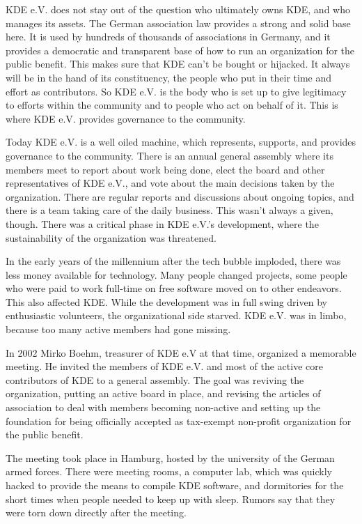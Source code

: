 KDE e.V. does not stay out of the question who ultimately owns KDE, and who manages its assets. The German association law provides a strong and solid base here. It is used by hundreds of thousands of associations in Germany, and it provides a democratic and transparent base of how to run an organization for the public benefit. This makes sure that KDE can't be bought or hijacked. It always will be in the hand of its constituency, the people who put in their time and effort as contributors. So KDE e.V. is the body who is set up to give legitimacy to efforts within the community and to people who act on behalf of it. This is where KDE e.V. provides governance to the community.

Today KDE e.V. is a well oiled machine, which represents, supports, and provides governance to the community. There is an annual general assembly where its members meet to report about work being done, elect the board and other representatives of KDE e.V., and vote about the main decisions taken by the organization. There are regular reports and discussions about ongoing topics, and there is a team taking care of the daily business. This wasn't always a given, though. There was a critical phase in KDE e.V.'s development, where the sustainability of the organization was threatened.

In the early years of the millennium after the tech bubble imploded, there was less money available for technology. Many people changed projects, some people who were paid to work full-time on free software moved on to other endeavors. This also affected KDE. While the development was in full swing driven by enthusiastic volunteers, the organizational side starved. KDE e.V. was in limbo, because too many active members had gone missing.

In 2002 Mirko Boehm, treasurer of KDE e.V at that time, organized a memorable meeting. He invited the members of KDE e.V. and most of the active core contributors of KDE to a general assembly. The goal was reviving the organization, putting an active board in place, and revising the articles of association to deal with members becoming non-active and setting up the foundation for being officially accepted as tax-exempt non-profit organization for the public benefit.

The meeting took place in Hamburg, hosted by the university of the German armed forces. There were meeting rooms, a computer lab, which was quickly hacked to provide the means to compile KDE software, and dormitories for the short times when people needed to keep up with sleep. Rumors say that they were torn down directly after the meeting.

